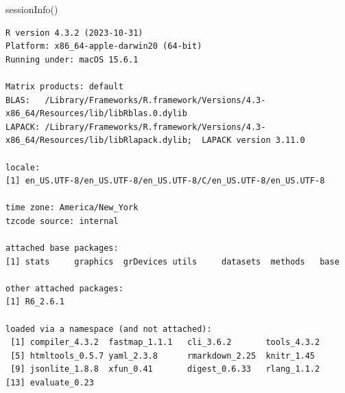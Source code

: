 \documentclass[
  letterpaper,
  DIV=11,
  numbers=noendperiod]{scrartcl}
\newenvironment{Shaded}{\begin{snugshade}}{\end{snugshade}}
\newcommand{\FunctionTok}[1]{\textcolor[rgb]{0.28,0.35,0.67}{#1}}
\newcommand{\NormalTok}[1]{\textcolor[rgb]{0.00,0.23,0.31}{#1}}
\begin{document}
\begin{Shaded}
\begin{Highlighting}[]
\FunctionTok{sessionInfo}\NormalTok{()}
\end{Highlighting}
\end{Shaded}

\begin{verbatim}
R version 4.3.2 (2023-10-31)
Platform: x86_64-apple-darwin20 (64-bit)
Running under: macOS 15.6.1

Matrix products: default
BLAS:   /Library/Frameworks/R.framework/Versions/4.3-x86_64/Resources/lib/libRblas.0.dylib 
LAPACK: /Library/Frameworks/R.framework/Versions/4.3-x86_64/Resources/lib/libRlapack.dylib;  LAPACK version 3.11.0

locale:
[1] en_US.UTF-8/en_US.UTF-8/en_US.UTF-8/C/en_US.UTF-8/en_US.UTF-8

time zone: America/New_York
tzcode source: internal

attached base packages:
[1] stats     graphics  grDevices utils     datasets  methods   base     

other attached packages:
[1] R6_2.6.1

loaded via a namespace (and not attached):
 [1] compiler_4.3.2  fastmap_1.1.1   cli_3.6.2       tools_4.3.2    
 [5] htmltools_0.5.7 yaml_2.3.8      rmarkdown_2.25  knitr_1.45     
 [9] jsonlite_1.8.8  xfun_0.41       digest_0.6.33   rlang_1.1.2    
[13] evaluate_0.23  
\end{verbatim}
\end{document}
